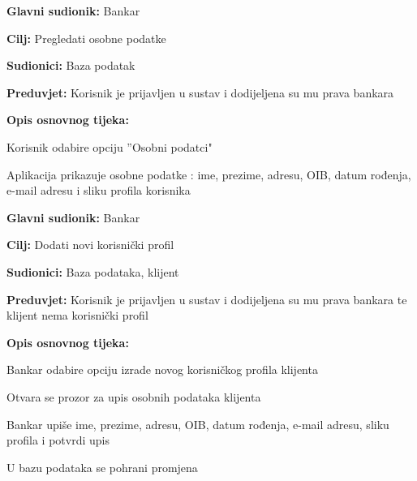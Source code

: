 		
			\noindent {}
			\begin{packed_item}
				
				\item \textbf{Glavni sudionik: }Bankar
				\item  \textbf{Cilj:} Pregledati osobne podatke
				\item  \textbf{Sudionici:} Baza podatak
				\item  \textbf{Preduvjet:} Korisnik je prijavljen u sustav i dodijeljena su mu prava bankara 
				\item  \textbf{Opis osnovnog tijeka:}
				
				\item[] \begin{packed_enum}
					\item  Korisnik odabire opciju ”Osobni podatci"
					\item  Aplikacija prikazuje osobne podatke : ime, prezime, adresu, OIB, datum rođenja, e-mail adresu i sliku profila korisnika
				\end{packed_enum}
				
			\end{packed_item}
            		
          
          
            \noindent {}
            \begin{packed_item}
                
                  \item \textbf{Glavni sudionik: }Bankar
                  \item  \textbf{Cilj:} Dodati novi korisnički profil
                  \item  \textbf{Sudionici:} Baza podataka, klijent
                  \item  \textbf{Preduvjet:} Korisnik je prijavljen u sustav i dodijeljena su mu prava bankara te klijent nema korisnički profil
                  \item  \textbf{Opis osnovnog tijeka:}
                  
                  \item[] \begin{packed_enum}
                
                    \item  Bankar odabire opciju izrade novog korisničkog profila klijenta
                    \item  Otvara se prozor za upis osobnih podataka klijenta
                    \item  Bankar upiše ime, prezime, adresu, OIB, datum rođenja, e-mail adresu, sliku profila i potvrdi upis
                    \item  U bazu podataka se pohrani promjena                              
                  \end{packed_enum}
                  
                \end{packed_item}
            
